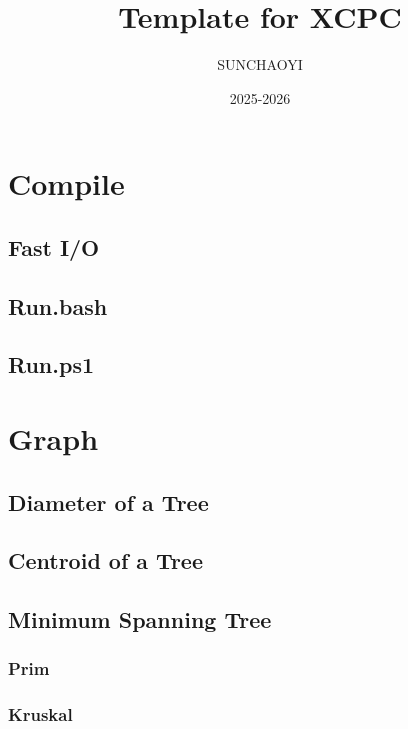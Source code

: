 \documentclass[a4paper]{article}
\title{Template for XCPC}
\author{SUNCHAOYI}
\date{2025-2026}
\begin{document}
\maketitle

\tableofcontents

\pagebreak

\section{Compile}

\subsection{Fast I/O}


\subsection{Run.bash}


\subsection{Run.ps1}


\pagebreak

\section{Graph}

\subsection{Diameter of a Tree}


\subsection{Centroid of a Tree}



\subsection{Minimum Spanning Tree}

\subsubsection{Prim}


\subsubsection{Kruskal}

\end{document}
